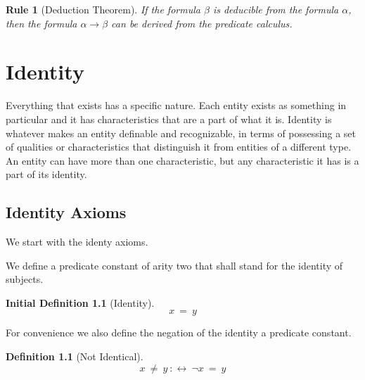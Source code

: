 \documentclass[a4paper,german,10pt,twoside]{book}
\newtheorem{rul}{Rule}
\theoremstyle{definition}
\newtheorem{defn}[thm]{Definition}
\newtheorem{idefn}[thm]{Initial Definition}
\theoremstyle{remark}
\begin{document}
\par


\begin{rul}[Deduction Theorem]
\label{rule:deductionTheorem} \hypertarget{rule:deductionTheorem}{}
If the formula $\beta$ is deducible from the formula $\alpha$, then the formula $\alpha \rightarrow \beta$ can be derived from the predicate calculus.
\end{rul}






\chapter{Identity} \label{chapter6} \hypertarget{chapter6}{}

Everything that exists has a specific nature. Each entity exists as something in particular and it has characteristics that are a part of what it is.
Identity is whatever makes an entity definable and recognizable, in terms of possessing a set of qualities or characteristics that distinguish it from entities of a different type. An entity can have more than one characteristic, but any characteristic it has is a part of its identity.

\section{Identity Axioms} \label{chapter6_section0} \hypertarget{chapter6_section0}{}
We start with the identy axioms.

\par
We define a predicate constant of arity two that shall stand for the identity of subjects.

\begin{idefn}[Identity]
\label{definition:identity} \hypertarget{definition:identity}{}
$$x \ =  \ y$$

\end{idefn}




\par
For convenience we also define the negation of the identity a predicate constant.

\begin{defn}[Not Identical]
\label{definition:notEqual} \hypertarget{definition:notEqual}{}
$$x \ \neq \ y\ :\leftrightarrow \ \neg x \ =  \ y$$

\end{defn}
\end{document}
